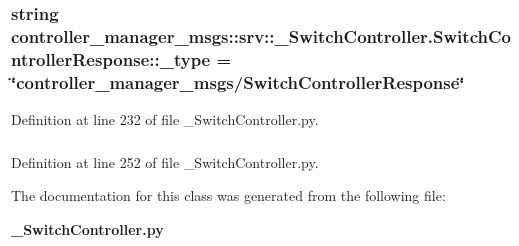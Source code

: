 \subsubsection[{\-\_\-type}]{\setlength{\rightskip}{0pt plus 5cm}string {\bf controller\-\_\-manager\-\_\-msgs\-::srv\-::\-\_\-\-Switch\-Controller.\-Switch\-Controller\-Response\-::\-\_\-type} = \char`\"{}controller\-\_\-manager\-\_\-msgs/{\bf \-Switch\-Controller\-Response}\char`\"{}\hspace{0.3cm}{\ttfamily  [static, private]}}\label{classcontroller__manager__msgs_1_1srv_1_1__SwitchController_1_1SwitchControllerResponse_ada726b922b1e9788e023844b19932b05}


\-Definition at line 232 of file \-\_\-\-Switch\-Controller.\-py.

\subsubsection[{ok}]{}\label{classcontroller__manager__msgs_1_1srv_1_1__SwitchController_1_1SwitchControllerResponse_ae0276105b285b1d313395415395661b7}


\-Definition at line 252 of file \-\_\-\-Switch\-Controller.\-py.



\-The documentation for this class was generated from the following file\-:\begin{DoxyCompactItemize}
\item 
{\bf \-\_\-\-Switch\-Controller.\-py}\end{DoxyCompactItemize}
